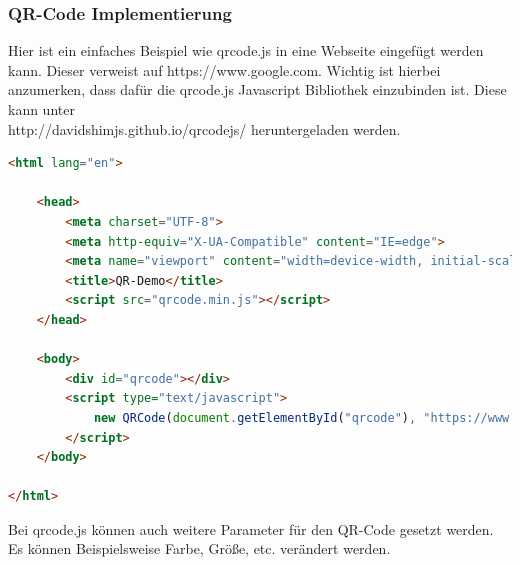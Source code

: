\subsubsection{QR-Code Implementierung}
Hier ist ein einfaches Beispiel wie qrcode.js in eine Webseite eingefügt werden kann.
Dieser verweist auf https://www.google.com. Wichtig ist hierbei anzumerken, dass dafür die qrcode.js Javascript Bibliothek einzubinden ist.
Diese kann unter \\ http://davidshimjs.github.io/qrcodejs/ heruntergeladen werden.  
\begin{lstlisting}[language=html,caption=QR-Code Demo,label=lst:tech:gaussianBlur]
<html lang="en">

    <head>
        <meta charset="UTF-8">
        <meta http-equiv="X-UA-Compatible" content="IE=edge">
        <meta name="viewport" content="width=device-width, initial-scale=1.0">
        <title>QR-Demo</title>
        <script src="qrcode.min.js"></script>
    </head>
    
    <body>
        <div id="qrcode"></div>
        <script type="text/javascript">
            new QRCode(document.getElementById("qrcode"), "https://www.google.com");
        </script>
    </body>
    
</html>
\end{lstlisting}

Bei qrcode.js können auch weitere Parameter für den QR-Code gesetzt werden. Es können
Beispielsweise Farbe, Größe, etc. verändert werden.

